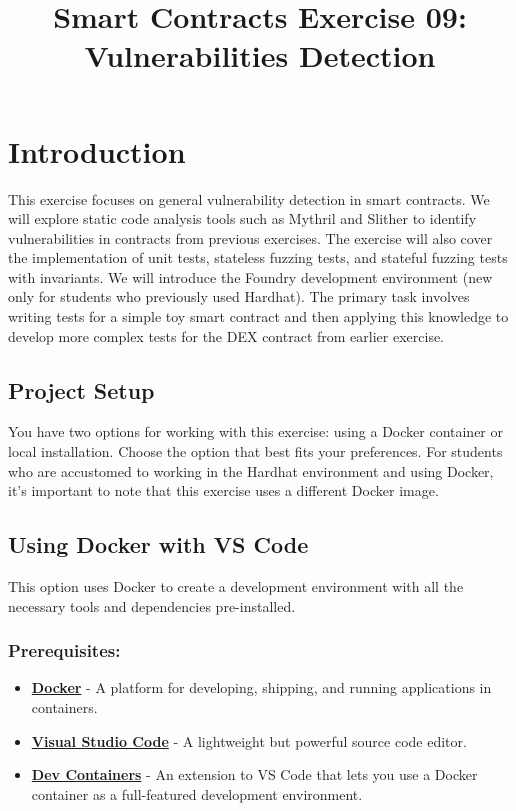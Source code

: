 \documentclass[12pt]{article}
\title{Smart Contracts Exercise 09: \\ Vulnerabilities Detection}
\author{}
\date{}
\begin{document}
\maketitle
\section{Introduction}

This exercise focuses on general vulnerability detection in smart contracts. We will explore static code analysis tools such as Mythril and Slither to identify vulnerabilities in contracts from previous exercises. The exercise will also cover the implementation of unit tests, stateless fuzzing tests, and stateful fuzzing tests with invariants. We will introduce the Foundry development environment (new only for students who previously used Hardhat). The primary task involves writing tests for a simple toy smart contract and then applying this knowledge to develop more complex tests for the DEX contract from earlier exercise.

\subsection*{Project Setup}

You have two options for working with this exercise: using a Docker container or local installation. Choose the option that best fits your preferences. For students who are accustomed to working in the Hardhat environment and using Docker, it's important to note that this exercise uses a different Docker image.

\subsection{Using Docker with VS Code}

This option uses Docker to create a development environment with all the necessary tools and dependencies pre-installed.

\subsubsection*{Prerequisites:}

\begin{itemize}
    \item \textbf{\href{https://www.docker.com/products/docker-desktop}{Docker}} - A platform for developing, shipping, and running applications in containers.
    \item \textbf{\href{https://code.visualstudio.com/}{Visual Studio Code}} - A lightweight but powerful source code editor.
    \item \textbf{\href{https://marketplace.visualstudio.com/items?itemName=ms-vscode-remote.remote-containers}{Dev Containers}} - An extension to VS Code that lets you use a Docker container as a full-featured development environment.
\end{itemize}
\end{document}
